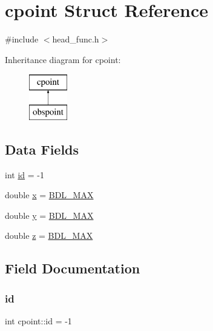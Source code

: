 \hypertarget{structcpoint}{}\section{cpoint Struct Reference}
\label{structcpoint}


{\ttfamily \#include $<$head\+\_\+func.\+h$>$}

Inheritance diagram for cpoint\+:\begin{figure}[H]
\begin{center}
\leavevmode
\includegraphics[height=2.000000cm]{structcpoint}
\end{center}
\end{figure}
\subsection*{Data Fields}
\begin{DoxyCompactItemize}
\item 
int \mbox{\hyperlink{structcpoint_aabd36e58b89a220977aaeb2211f51584}{id}} = -\/1
\item 
double \mbox{\hyperlink{structcpoint_a8668211511f21152b39662749f934ba0}{x}} = \mbox{\hyperlink{head__func_8h_a171f39ecf5d0b8067fd66e19e82f334d}{B\+D\+L\+\_\+\+M\+AX}}
\item 
double \mbox{\hyperlink{structcpoint_a717acc3777220676c593ab92e08115b6}{y}} = \mbox{\hyperlink{head__func_8h_a171f39ecf5d0b8067fd66e19e82f334d}{B\+D\+L\+\_\+\+M\+AX}}
\item 
double \mbox{\hyperlink{structcpoint_a2e66f7e13b28a8344755e564bb096cfa}{z}} = \mbox{\hyperlink{head__func_8h_a171f39ecf5d0b8067fd66e19e82f334d}{B\+D\+L\+\_\+\+M\+AX}}
\end{DoxyCompactItemize}


\subsection{Field Documentation}
\mbox{\label{structcpoint_aabd36e58b89a220977aaeb2211f51584}} 
\subsubsection{\texorpdfstring{id}{id}}
{\footnotesize\ttfamily int cpoint\+::id = -\/1}

